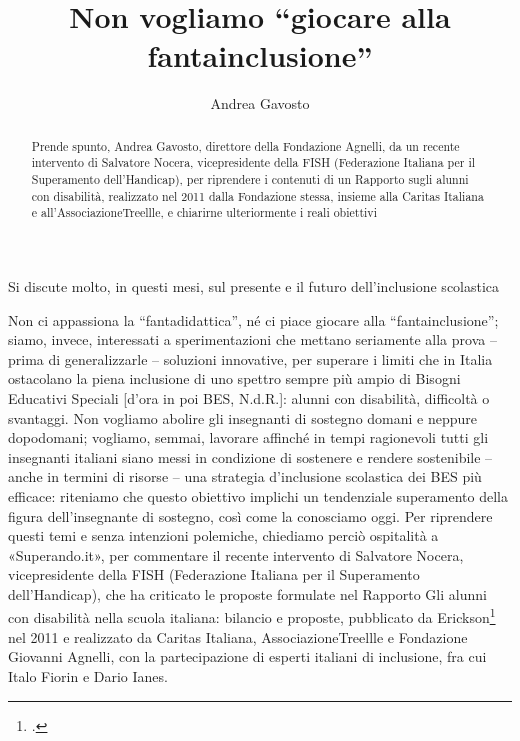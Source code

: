 \author{Andrea Gavosto}
\title{Non vogliamo “giocare alla fantainclusione”}
\label{cha:gavosto270513}
\begin{abstract}
Prende spunto, Andrea Gavosto, direttore della Fondazione Agnelli, da un recente intervento di Salvatore Nocera, vicepresidente della FISH (Federazione Italiana per il Superamento dell’Handicap), per riprendere i contenuti di un Rapporto sugli alunni con disabilità, realizzato nel 2011 dalla Fondazione stessa, insieme alla Caritas Italiana e all’AssociazioneTreellle, e chiarirne ulteriormente i reali obiettivi
\end{abstract}
\maketitle
{}
Si discute molto, in questi mesi, sul presente e il futuro dell'inclusione scolastica

Non ci appassiona la “fantadidattica”, né ci piace giocare alla “fantainclusione”; siamo, invece, interessati a sperimentazioni che mettano seriamente alla prova – prima di generalizzarle – soluzioni innovative, per superare i limiti che in Italia ostacolano la piena inclusione di uno spettro sempre più ampio di Bisogni Educativi Speciali [d'ora in poi BES, N.d.R.]: alunni con disabilità, difficoltà o svantaggi.
Non vogliamo abolire gli insegnanti di sostegno domani e neppure dopodomani; vogliamo, semmai, lavorare affinché in tempi ragionevoli tutti gli insegnanti italiani siano messi in condizione di sostenere e rendere sostenibile – anche in termini di risorse – una strategia d'inclusione scolastica dei BES più efficace: riteniamo che questo obiettivo implichi un tendenziale superamento della figura dell'insegnante di sostegno, così come la conosciamo oggi.
Per riprendere questi temi e senza intenzioni polemiche, chiediamo perciò ospitalità a «Superando.it», per commentare il recente intervento\pageref{cha:nocera130513} di Salvatore Nocera, vicepresidente della FISH (Federazione Italiana per il Superamento dell'Handicap), che ha criticato le proposte formulate nel Rapporto Gli alunni con disabilità nella scuola italiana: bilancio e proposte, pubblicato da Erickson\footcite{treellle2011alunni} nel 2011 e realizzato da Caritas Italiana, AssociazioneTreellle e Fondazione Giovanni Agnelli, con la partecipazione di esperti italiani di inclusione, fra cui Italo Fiorin e Dario Ianes.

